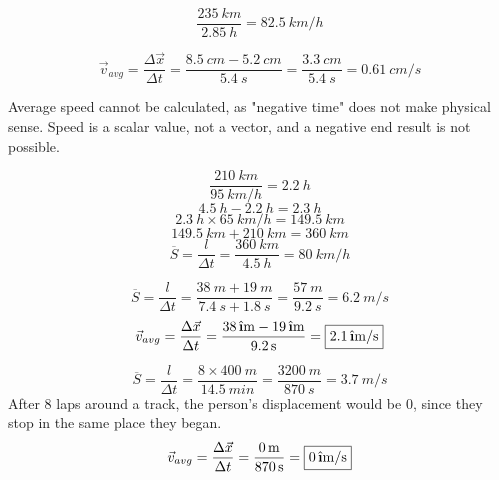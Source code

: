 \documentclass[11pt]{homework}
\newcommand{\ihat}{\hat{\textbf{\i}}}
\begin{document}
\maketitle

\renewcommand{\questiontype}{Problem}
\setcounter{questionCounter}{1}

\question
\[
  \frac{\qty{235}{km}}{\qty{2.85}{h}} = \boxed{\qty{82.5}{km/h}}
\]

\question
$$
\vec v_{avg} = \frac{\Delta \vec x}{\Delta t} = \frac{\qty{8.5}{cm} - \qty{5.2}{cm}}{\qty{5.4}{s}}= \frac{\qty{3.3}{cm}}{\qty{5.4}{s}} = \boxed{\qty{0.61}{cm/s}}
$$

Average speed cannot be calculated, as "negative time" does not make physical sense. Speed is a scalar value, not a vector, and a negative end result is not possible.

\setcounter{questionCounter}{4}
\question
  \begin{alphaparts}
    \questionpart
      \[
        \frac{\qty{210}{km}}{\qty{95}{km/h}} = \qty{2.2}{h}
      \]
      \[
        \qty{4.5}{h} - \qty{2.2}{h} = \qty{2.3}{h} 
      \]
      \[
        \qty{2.3}{h} \times \qty{65}{km/h} = \qty{149.5}{km}
      \]
      \[
      \qty{149.5}{km} + \qty{210}{km} = \boxed{\qty{360}{km}} 
      \]
    \questionpart
      \[
      \overline{S} = \frac{l}{\Delta t} = \frac{\qty{360}{km}}{\qty{4.5}{h}} = \boxed{\qty{80}{km/h}}   
      \]
  \end{alphaparts} 
\question
  \begin{alphaparts}
    \questionpart
      \[
        \overline{S} = \frac{l}{\Delta t} = \frac{\qty{38}{m} + \qty{19}{m}}{\qty{7.4}{s} + \qty{1.8}{s}} = \frac{\qty{57}{m}}{\qty{9.2}{s}} = \boxed{\qty{6.2}{m/s}}
      \]
    \questionpart
      \[
      {\vec v_{avg}} = \frac{\Delta \vec x}{\Delta t} = \frac{\qty{38}{\ihat m} - \qty{19}{\ihat m}}{\qty{9.2}{s}} =\boxed{\qty{2.1}{\ihat  m/s}}        
      \]
  \end{alphaparts}
\question
\begin{alphaparts}
    \questionpart
      \[
        \overline{S} = \frac{l}{\Delta t} =\frac{ 8 \times \qty{400}{m}}{\qty{14.5}{min}} = \frac{\qty{3200}{m}}{\qty{870}{s}} = \boxed{\qty{3.7}{m/s}}
      \]
    \questionpart
      After 8 laps around a track, the person's displacement would be 0, since they stop in the same place they began.
      \[
      {\vec v_{avg}} = \frac{\Delta \vec x}{\Delta t} = \frac{\qty{0}{m}}{\qty{870}{s}} =\boxed{\qty{0}{\ihat  m/s}}        
      \]
  \end{alphaparts}
\end{document}

